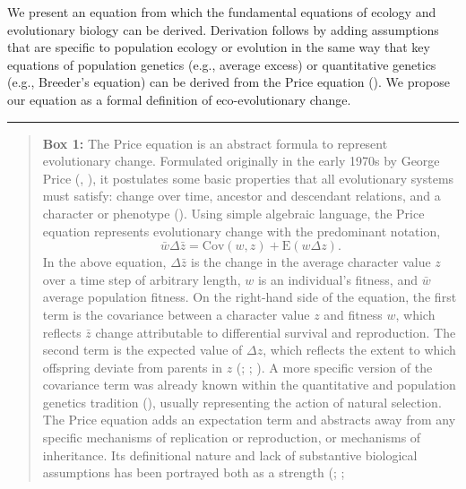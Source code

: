\documentclass[
]{article}
\begin{document}
We present an equation from which the fundamental equations of ecology
and evolutionary biology can be derived. Derivation follows by adding
assumptions that are specific to population ecology or evolution in the
same way that key equations of population genetics (e.g., average
excess) or quantitative genetics (e.g., Breeder's equation) can be
derived from the Price equation (). We propose our equation as a formal definition of
eco-evolutionary change.

\begin{center}\rule{0.5\linewidth}{0.5pt}\end{center}

\begin{quote}
\textbf{Box 1:} The Price equation is an abstract formula to represent
evolutionary change. Formulated originally in the early 1970s by George
Price (,
), it postulates some basic properties
that all evolutionary systems must satisfy: change over time, ancestor
and descendant relations, and a character or phenotype
(). Using simple algebraic language,
the Price equation represents evolutionary change with the predominant
notation,
\[\bar{w}\Delta\bar{z} = \mathrm{Cov}\left(w, z\right) + \mathrm{E}\left(w\Delta z\right).\]
In the above equation, \(\Delta\bar{z}\) is the change in the average
character value \(z\) over a time step of arbitrary length, \(w\) is an
individual's fitness, and \(\bar{w}\) average population fitness. On the
right-hand side of the equation, the first term is the covariance
between a character value \(z\) and fitness \(w\), which reflects
\(\bar{z}\) change attributable to differential survival and
reproduction. The second term is the expected value of \(\Delta z\),
which reflects the extent to which offspring deviate from parents in
\(z\) (;
; ). A more specific version of the covariance term was already known
within the quantitative and population genetics tradition
(), usually representing the
action of natural selection. The Price equation adds an expectation term
and abstracts away from any specific mechanisms of replication or
reproduction, or mechanisms of inheritance. Its definitional nature and
lack of substantive biological assumptions has been portrayed both as a
strength (;
; 
\end{quote}
\end{document}
